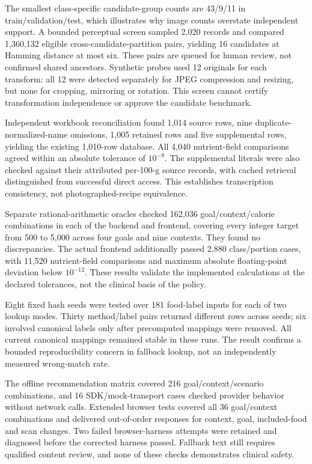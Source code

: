 \documentclass[12pt,journal,draftclsnofoot,onecolumn]{IEEEtran}
\begin{document}
The smallest class-specific candidate-group counts are 43/9/11 in train/validation/test, which illustrates why image counts overstate independent support. A bounded perceptual screen sampled 2,020 records and compared 1,360,132 eligible cross-candidate-partition pairs, yielding 16 candidates at Hamming distance at most six. These pairs are queued for human review, not confirmed shared ancestors. Synthetic probes used 12 originals for each transform: all 12 were detected separately for JPEG compression and resizing, but none for cropping, mirroring or rotation. This screen cannot certify transformation independence or approve the candidate benchmark.

Independent workbook reconciliation found 1,014 source rows, nine duplicate-normalized-name omissions, 1,005 retained rows and five supplemental rows, yielding the existing 1,010-row database. All 4,040 nutrient-field comparisons agreed within an absolute tolerance of $10^{-9}$. The supplemental literals were also checked against their attributed per-100-g source records, with cached retrieval distinguished from successful direct access. This establishes transcription consistency, not photographed-recipe equivalence.

Separate rational-arithmetic oracles checked 162,036 goal/context/calorie combinations in each of the backend and frontend, covering every integer target from 500 to 5,000 across four goals and nine contexts. They found no discrepancies. The actual frontend additionally passed 2,880 class/portion cases, with 11,520 nutrient-field comparisons and maximum absolute floating-point deviation below $10^{-12}$. These results validate the implemented calculations at the declared tolerances, not the clinical basis of the policy.

Eight fixed hash seeds were tested over 181 food-label inputs for each of two lookup modes. Thirty method/label pairs returned different rows across seeds; six involved canonical labels only after precomputed mappings were removed. All current canonical mappings remained stable in these runs. The result confirms a bounded reproducibility concern in fallback lookup, not an independently measured wrong-match rate.

The offline recommendation matrix covered 216 goal/context/scenario combinations, and 16 SDK/mock-transport cases checked provider behavior without network calls. Extended browser tests covered all 36 goal/context combinations and delivered out-of-order responses for context, goal, included-food and scan changes. Two failed browser-harness attempts were retained and diagnosed before the corrected harness passed. Fallback text still requires qualified content review, and none of these checks demonstrates clinical safety.
\end{document}

